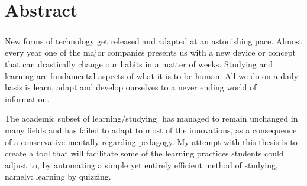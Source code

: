 \chapter*{Abstract}
\label{cha:abstract}

\paragraph{}
New forms of technology get released and adapted at an astonishing pace. Almost
every year one of the major companies presents us with a new device or concept
that can drastically change our habits in a matter of weeks.
Studying and learning are fundamental aspects of what it is to be human. All we do
on a daily basis is learn, adapt and develop ourselves to a never ending world of
information.

The academic subset of learning/studying ​ has managed to remain unchanged in
many fields and has failed to adapt to most of the innovations, as a consequence of
a conservative mentally regarding pedagogy.
My attempt with this thesis is to create a tool that will facilitate some of the learning
practices students could adjust to, by automating a simple yet entirely efficient
method of studying, namely: learning by quizzing.